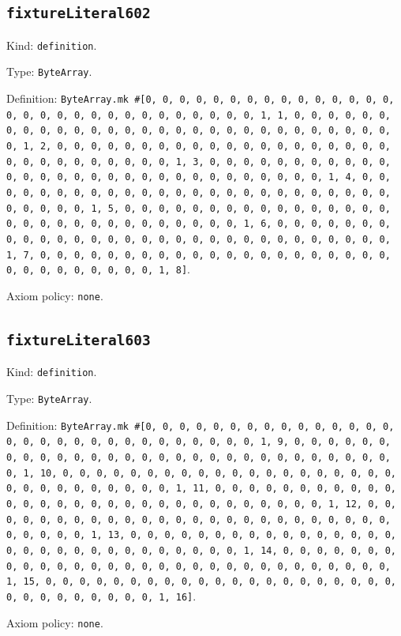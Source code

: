\documentclass[11pt]{article}
\begin{document}
\subsection*{\texttt{fixtureLiteral602}}
\noindent Kind: \texttt{definition}.\par
\noindent Type: \texttt{ByteArray}.\par
\noindent Definition: \texttt{ByteArray.mk \#[0, 0, 0, 0, 0, 0, 0, 0, 0, 0, 0, 0, 0, 0, 0, 0, 0, 0, 0, 0, 0, 0, 0, 0, 0, 0, 0, 0, 0, 0, 1, 1, 0, 0, 0, 0, 0, 0, 0, 0, 0, 0, 0, 0, 0, 0, 0, 0, 0, 0, 0, 0, 0, 0, 0, 0, 0, 0, 0, 0, 0, 0, 1, 2, 0, 0, 0, 0, 0, 0, 0, 0, 0, 0, 0, 0, 0, 0, 0, 0, 0, 0, 0, 0, 0, 0, 0, 0, 0, 0, 0, 0, 0, 0, 1, 3, 0, 0, 0, 0, 0, 0, 0, 0, 0, 0, 0, 0, 0, 0, 0, 0, 0, 0, 0, 0, 0, 0, 0, 0, 0, 0, 0, 0, 0, 0, 1, 4, 0, 0, 0, 0, 0, 0, 0, 0, 0, 0, 0, 0, 0, 0, 0, 0, 0, 0, 0, 0, 0, 0, 0, 0, 0, 0, 0, 0, 0, 0, 1, 5, 0, 0, 0, 0, 0, 0, 0, 0, 0, 0, 0, 0, 0, 0, 0, 0, 0, 0, 0, 0, 0, 0, 0, 0, 0, 0, 0, 0, 0, 0, 1, 6, 0, 0, 0, 0, 0, 0, 0, 0, 0, 0, 0, 0, 0, 0, 0, 0, 0, 0, 0, 0, 0, 0, 0, 0, 0, 0, 0, 0, 0, 0, 1, 7, 0, 0, 0, 0, 0, 0, 0, 0, 0, 0, 0, 0, 0, 0, 0, 0, 0, 0, 0, 0, 0, 0, 0, 0, 0, 0, 0, 0, 0, 0, 1, 8]}.\par
\noindent Axiom policy: \texttt{none}.\par
\subsection*{\texttt{fixtureLiteral603}}
\noindent Kind: \texttt{definition}.\par
\noindent Type: \texttt{ByteArray}.\par
\noindent Definition: \texttt{ByteArray.mk \#[0, 0, 0, 0, 0, 0, 0, 0, 0, 0, 0, 0, 0, 0, 0, 0, 0, 0, 0, 0, 0, 0, 0, 0, 0, 0, 0, 0, 0, 0, 1, 9, 0, 0, 0, 0, 0, 0, 0, 0, 0, 0, 0, 0, 0, 0, 0, 0, 0, 0, 0, 0, 0, 0, 0, 0, 0, 0, 0, 0, 0, 0, 1, 10, 0, 0, 0, 0, 0, 0, 0, 0, 0, 0, 0, 0, 0, 0, 0, 0, 0, 0, 0, 0, 0, 0, 0, 0, 0, 0, 0, 0, 0, 0, 1, 11, 0, 0, 0, 0, 0, 0, 0, 0, 0, 0, 0, 0, 0, 0, 0, 0, 0, 0, 0, 0, 0, 0, 0, 0, 0, 0, 0, 0, 0, 0, 1, 12, 0, 0, 0, 0, 0, 0, 0, 0, 0, 0, 0, 0, 0, 0, 0, 0, 0, 0, 0, 0, 0, 0, 0, 0, 0, 0, 0, 0, 0, 0, 1, 13, 0, 0, 0, 0, 0, 0, 0, 0, 0, 0, 0, 0, 0, 0, 0, 0, 0, 0, 0, 0, 0, 0, 0, 0, 0, 0, 0, 0, 0, 0, 1, 14, 0, 0, 0, 0, 0, 0, 0, 0, 0, 0, 0, 0, 0, 0, 0, 0, 0, 0, 0, 0, 0, 0, 0, 0, 0, 0, 0, 0, 0, 0, 1, 15, 0, 0, 0, 0, 0, 0, 0, 0, 0, 0, 0, 0, 0, 0, 0, 0, 0, 0, 0, 0, 0, 0, 0, 0, 0, 0, 0, 0, 0, 0, 1, 16]}.\par
\noindent Axiom policy: \texttt{none}.\par
\end{document}
